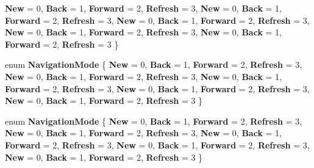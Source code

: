\begin{DoxyCompactItemize}
{\bfseries New} = 0, 
{\bfseries Back} = 1, 
{\bfseries Forward} = 2, 
{\bfseries Refresh} = 3, 
\newline
{\bfseries New} = 0, 
{\bfseries Back} = 1, 
{\bfseries Forward} = 2, 
{\bfseries Refresh} = 3, 
\newline
{\bfseries New} = 0, 
{\bfseries Back} = 1, 
{\bfseries Forward} = 2, 
{\bfseries Refresh} = 3, 
\newline
{\bfseries New} = 0, 
{\bfseries Back} = 1, 
{\bfseries Forward} = 2, 
{\bfseries Refresh} = 3, 
\newline
{\bfseries New} = 0, 
{\bfseries Back} = 1, 
{\bfseries Forward} = 2, 
{\bfseries Refresh} = 3
 \}
\item 
\mbox{\label{namespace_windows_1_1_u_i_1_1_xaml_1_1_navigation_a9f750cdbb9b4eeea3e47b65bb545d522}} 
enum {\bfseries Navigation\+Mode} \{ \newline
{\bfseries New} = 0, 
{\bfseries Back} = 1, 
{\bfseries Forward} = 2, 
{\bfseries Refresh} = 3, 
\newline
{\bfseries New} = 0, 
{\bfseries Back} = 1, 
{\bfseries Forward} = 2, 
{\bfseries Refresh} = 3, 
\newline
{\bfseries New} = 0, 
{\bfseries Back} = 1, 
{\bfseries Forward} = 2, 
{\bfseries Refresh} = 3, 
\newline
{\bfseries New} = 0, 
{\bfseries Back} = 1, 
{\bfseries Forward} = 2, 
{\bfseries Refresh} = 3, 
\newline
{\bfseries New} = 0, 
{\bfseries Back} = 1, 
{\bfseries Forward} = 2, 
{\bfseries Refresh} = 3
 \}
\item 
\mbox{\label{namespace_windows_1_1_u_i_1_1_xaml_1_1_navigation_a9f750cdbb9b4eeea3e47b65bb545d522}} 
enum {\bfseries Navigation\+Mode} \{ \newline
{\bfseries New} = 0, 
{\bfseries Back} = 1, 
{\bfseries Forward} = 2, 
{\bfseries Refresh} = 3, 
\newline
{\bfseries New} = 0, 
{\bfseries Back} = 1, 
{\bfseries Forward} = 2, 
{\bfseries Refresh} = 3, 
\newline
{\bfseries New} = 0, 
{\bfseries Back} = 1, 
{\bfseries Forward} = 2, 
{\bfseries Refresh} = 3, 
\newline
{\bfseries New} = 0, 
{\bfseries Back} = 1, 
{\bfseries Forward} = 2, 
{\bfseries Refresh} = 3, 
\newline
{\bfseries New} = 0, 
{\bfseries Back} = 1, 
{\bfseries Forward} = 2, 
{\bfseries Refresh} = 3
 \}
\end{DoxyCompactItemize}

